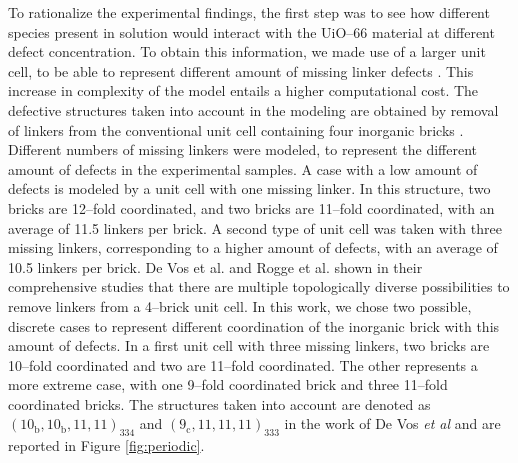 To rationalize the experimental findings, the first step was to see how different species present in solution would interact with the UiO--66 material at different defect concentration. To obtain this information, we made use of a larger unit cell, to be able to represent different amount of missing linker defects \cite{rogge2016thermodynamic, devos2017missing, svane2018vacancy}. This increase in complexity of the model entails a higher computational cost. The defective structures taken into account in the modeling are obtained by removal of linkers from the conventional unit cell containing four inorganic  bricks \cite{cavka2008new}. Different numbers of missing linkers were modeled, to represent the different amount of defects in the experimental samples. A case with a low amount of defects is modeled by a unit cell with one missing linker. In this structure, two bricks are 12--fold coordinated, and two bricks are 11--fold coordinated, with an average of 11.5 linkers per brick. A second type of unit cell was taken with three missing linkers, corresponding to a higher amount of defects, with an average of 10.5 linkers per brick. De Vos et al. and Rogge et al.\cite{devos2017missing, rogge2016thermodynamic} shown in their comprehensive studies that there are multiple topologically diverse possibilities to remove linkers from a 4--brick unit cell. In this work, we chose two possible, discrete cases to represent different coordination of the inorganic brick with this amount of defects. In a first unit cell with three missing linkers, two bricks are 10--fold coordinated and two are 11--fold coordinated. The other represents a more extreme case, with one 9--fold coordinated brick and three 11--fold coordinated bricks. The structures taken into account are denoted as $\mathrm{(10_{b}, 10_{b}, 11, 11)_{334}}$ and $\mathrm{(9_{c}, 11, 11, 11)_{333}}$ in the work of De Vos \textit{et al}\cite{devos2017missing} and are reported in Figure \ref{fig:periodic}.
\npar
